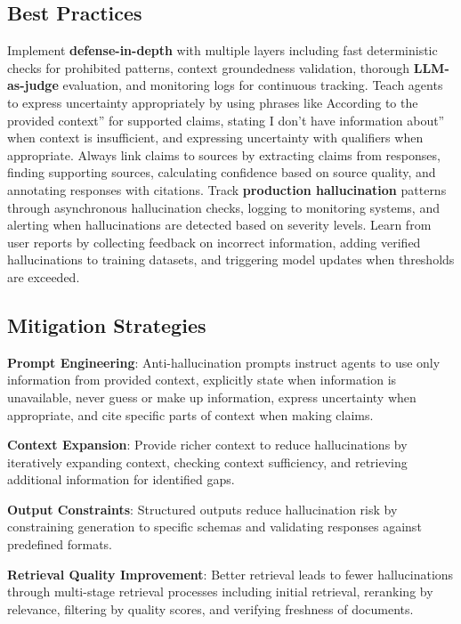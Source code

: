 \begin{TNtwocol}
\subsection*{Best Practices}

Implement \textbf{defense-in-depth} with multiple layers including fast deterministic checks for prohibited patterns, context groundedness validation, thorough \textbf{LLM-as-judge} evaluation, and monitoring logs for continuous tracking. Teach agents to express uncertainty appropriately by using phrases like According to the provided context'' for supported claims, stating I don't have information about'' when context is insufficient, and expressing uncertainty with qualifiers when appropriate. Always link claims to sources by extracting claims from responses, finding supporting sources, calculating confidence based on source quality, and annotating responses with citations. Track \textbf{production hallucination} patterns through asynchronous hallucination checks, logging to monitoring systems, and alerting when hallucinations are detected based on severity levels. Learn from user reports by collecting feedback on incorrect information, adding verified hallucinations to training datasets, and triggering model updates when thresholds are exceeded.

\subsection*{Mitigation Strategies}

{\textbf{Prompt Engineering}}: Anti-hallucination prompts instruct agents to use only information from provided context, explicitly state when information is unavailable, never guess or make up information, express uncertainty when appropriate, and cite specific parts of context when making claims.

{\textbf{Context Expansion}}: Provide richer context to reduce hallucinations by iteratively expanding context, checking context sufficiency, and retrieving additional information for identified gaps.

{\textbf{Output Constraints}}: Structured outputs reduce hallucination risk by constraining generation to specific schemas and validating responses against predefined formats.

{\textbf{Retrieval Quality Improvement}}: Better retrieval leads to fewer hallucinations through multi-stage retrieval processes including initial retrieval, reranking by relevance, filtering by quality scores, and verifying freshness of documents.


\end{TNtwocol}
